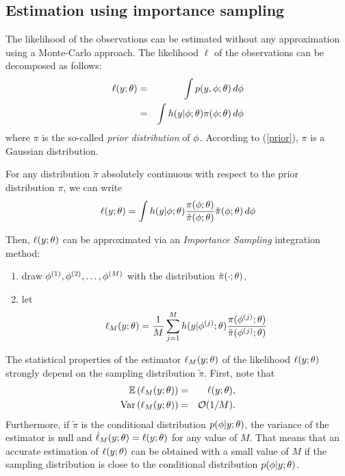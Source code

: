 \subsection{Estimation using importance sampling}

The likelihood of the observations can be estimated without any approximation using a Monte-Carlo approach. The likelihood $\ell$ of the observations can be decomposed as follows:
\begin{eqnarray*}
 \ell(y;{\theta}) &=& \int p(y,{\phi};{\theta})\,d{\phi} \\
&=& \int h(y|{\phi};{\theta})\pi({\phi};{\theta})\,d{\phi}
\end{eqnarray*}
where $\pi$ is the so-called {\it prior distribution} of ${\phi}$. According to (\ref{prior}), $\pi$ is a Gaussian distribution.

For any distribution $\tilde{\pi}$ absolutely continuous with respect to the prior distribution $\pi$, we can write
$$
\ell(y;{\theta}) = \int h(y|{\phi};{\theta}) \frac {\pi({\phi};{\theta})}{
\tilde{\pi}({\phi};{\theta}) }  \tilde{\pi}({\phi};{\theta}) \,d{\phi}
$$


Then, $\ell(y;{\theta})$ can be approximated via an {\it Importance Sampling} integration method:
\begin{enumerate}
\item draw ${\phi}^{(1)} ,{\phi}^{(2)} ,\ldots,{\phi}^{(M)} $ with the distribution $\tilde{\pi}(\cdot;{\theta})$,
\item let
\begin{equation} \label{islike}
 \ell_M(y;{\theta}) =\frac{1}{M} \sum_{j=1}^{M} h(y|{\phi}^{(j)};{\theta} )\frac{\pi( {\phi}^{(j)} ;{\theta})}{ \tilde{\pi}({\phi}^{(j)} ;{\theta}) }
\end{equation}
\end{enumerate}

The statistical properties of the estimator $\ell_M(y;{\theta})$ of the likelihood
$\ell(y;{\theta})$ strongly depend on the sampling distribution  $\tilde{\pi}$. First, note that
\begin{eqnarray*}
\mathbb{E}\left({\ell}_M(y;{\theta})\right) &=& \ell(y;{\theta}), \\
\mbox{Var}\left({\ell}_M(y;{\theta})\right) &=& {\cal O}(1/M).
\end{eqnarray*}
Furthermore, if $\tilde{\pi}$ is the conditional distribution $p(\phi|y;{\theta})$, the variance of the estimator is null and $\hat{\ell}_M(y;{\theta}) = \ell(y;{\theta})$ for any value of $M$. That means that an accurate estimation of $\ell(y;{\theta})$ can be obtained with a small value of $M$ if the sampling distribution is close to the conditional distribution $p(\phi|y;{\theta})$.

